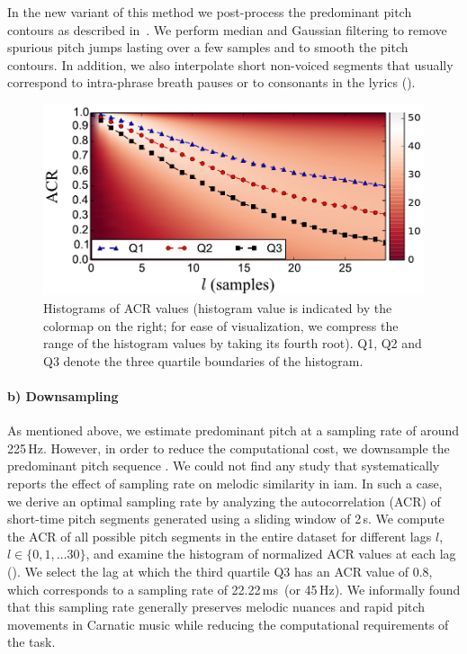 In the new variant of this method we post-process the predominant pitch contours as described in~. We perform median and Gaussian filtering to remove spurious pitch jumps lasting over a few samples and to smooth the pitch contours. In addition, we also interpolate short non-voiced segments that usually correspond to intra-phrase breath pauses or to consonants in the lyrics (). 


\begin{figure}
	\begin{center}
		\includegraphics[width=\figSizeEightyFive]{ch06_patterns/figures/discovery/ACRHistogram.pdf}
	\end{center}
	\caption{Histograms of ACR values (histogram value is indicated by the colormap on the right; for ease of visualization, we compress the range of the histogram values by taking its fourth root). Q1, Q2 and Q3 denote the three quartile boundaries of the histogram. }
	\label{fig:ACRHistogram}
\end{figure}


\paragraph{b) Downsampling}

As mentioned above, we estimate predominant pitch at a sampling rate of around 225\,Hz. However, in order to reduce the computational cost, we downsample the predominant pitch sequence . We could not find any study that systematically reports the effect of sampling rate on melodic similarity in \gls{iam}. In such a case, we derive an optimal sampling rate by analyzing the autocorrelation (ACR) of short-time pitch segments generated using a sliding window of 2\,s. We compute the ACR of all possible pitch segments in the entire dataset for different lags $l$, $l\in \lbrace0,1,\dots30\rbrace$, and examine the histogram of normalized ACR values at each lag (). We select the lag at which the third quartile Q3 has an ACR value of 0.8, which corresponds to a sampling rate of 22.22\,ms~(or 45\,Hz). We informally found that this sampling rate generally preserves melodic nuances and rapid pitch movements in Carnatic music while reducing the computational requirements of the task. 


